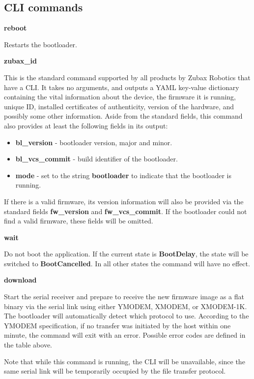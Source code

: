 \documentclass{zubaxdoc}
\begin{document}
\subsection{CLI commands}

\textbf{reboot}

Restarts the bootloader.

\textbf{zubax{\_}id}

This is the standard command supported by all products by Zubax Robotics that have a CLI. It takes no arguments, and outputs a YAML key-value dictionary containing the vital information about the device, the firmware it is running, unique ID, installed certificates of authenticity, version of the hardware, and possibly some other information. Aside from the standard fields, this command also provides at least the following fields in its output:

\begin{itemize}
\item \textbf{bl{\_}version} - bootloader version, major and minor.
\item \textbf{bl{\_}vcs{\_}commit} - build identifier of the bootloader.
\item \textbf{mode} - set to the string \textbf{bootloader} to indicate that the bootloader is running.
\end{itemize}

If there is a valid firmware, its version information will also be provided via the standard fields \textbf{fw{\_}version} and  \textbf{fw{\_}vcs{\_}commit}. If the bootloader could not find a valid firmware, these fields will be omitted.

\textbf{wait}

Do not boot the application. If the current state is \textbf{BootDelay}, the state will be switched to \textbf{BootCancelled}. In all other states the command will have no effect.

\textbf{download}

Start the serial receiver and prepare to receive the new firmware image as a flat binary via the serial link using either YMODEM, XMODEM, or XMODEM-1K. The bootloader will automatically detect which protocol to use. According to the YMODEM specification, if no transfer was initiated by the host within one minute, the command will exit with an error. Possible error codes are defined in the table above.

Note that while this command is running, the CLI will be unavailable, since the same serial link will be temporarily occupied by the file transfer protocol.
\end{document}
